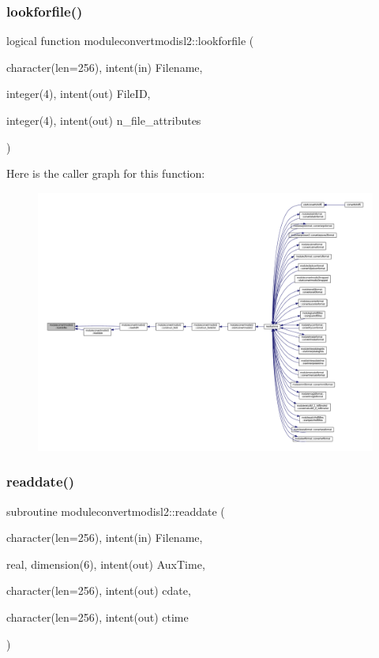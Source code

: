 \subsubsection{\texorpdfstring{lookforfile()}{lookforfile()}}
{\footnotesize\ttfamily logical function moduleconvertmodisl2\+::lookforfile (\begin{DoxyParamCaption}\item[{character(len=256), intent(in)}]{Filename,  }\item[{integer(4), intent(out)}]{File\+ID,  }\item[{integer(4), intent(out)}]{n\+\_\+file\+\_\+attributes }\end{DoxyParamCaption})\hspace{0.3cm}{\ttfamily [private]}}

Here is the caller graph for this function\+:\nopagebreak
\begin{figure}[H]
\begin{center}
\leavevmode
\includegraphics[width=350pt]{namespacemoduleconvertmodisl2_a95ba390f4da93899410109801bcd5011_icgraph}
\end{center}
\end{figure}
\mbox{\label{namespacemoduleconvertmodisl2_a0d7d930d189037284103c8340c2d3cf6}} 
\subsubsection{\texorpdfstring{readdate()}{readdate()}}
{\footnotesize\ttfamily subroutine moduleconvertmodisl2\+::readdate (\begin{DoxyParamCaption}\item[{character(len=256), intent(in)}]{Filename,  }\item[{real, dimension(6), intent(out)}]{Aux\+Time,  }\item[{character(len=256), intent(out)}]{cdate,  }\item[{character(len=256), intent(out)}]{ctime }\end{DoxyParamCaption})\hspace{0.3cm}{\ttfamily [private]}}

